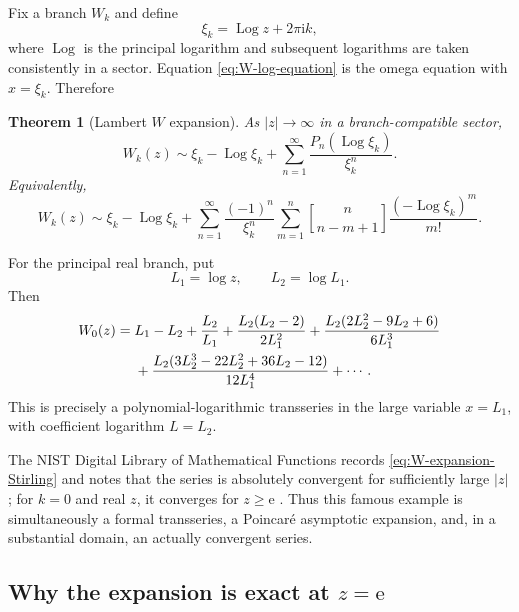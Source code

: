\documentclass[11pt]{article}
\theoremstyle{pltheorem}
\newtheorem{theorem}{Theorem}[section]
\newcommand{\e}{\mathrm e}
\newcommand{\ii}{\mathrm i}
\newcommand{\Log}{\operatorname{Log}}
\newcommand{\stirlingone}[2]{\genfrac{[}{]}{0pt}{}{#1}{#2}}
\newcommand{\abs}[1]{\left|#1\right|}
\begin{document}
Fix a branch \(W_k\) and define
\begin{equation}\label{eq:xi-k}
 \xi_k=\Log z+2\pi\ii k,
\end{equation}
where \(\Log\) is the principal logarithm and subsequent logarithms are taken consistently in a sector.  Equation \cref{eq:W-log-equation} is the omega equation with \(x=\xi_k\).  Therefore
\begin{theorem}[Lambert \(W\) expansion]\label{thm:W-expansion}
As \(\abs{z}\to\infty\) in a branch-compatible sector,
\begin{equation}\label{eq:W-expansion-P}
 \boxed{\quad
 W_k(z)\sim \xi_k-\Log\xi_k
 +\sum_{n=1}^{\infty}
 \frac{P_n(\Log\xi_k)}{\xi_k^n}.
 \quad}
\end{equation}
Equivalently,
\begin{equation}\label{eq:W-expansion-Stirling}
 W_k(z)\sim\xi_k-\Log\xi_k
 +\sum_{n=1}^{\infty}\frac{(-1)^n}{\xi_k^n}
 \sum_{m=1}^{n}\stirlingone{n}{n-m+1}
 \frac{(-\Log\xi_k)^m}{m!}.
\end{equation}
\end{theorem}

For the principal real branch, put
\begin{equation}\label{eq:L1-L2}
 L_1=\log z,
 \qquad
 L_2=\log L_1.
\end{equation}
Then
\begin{align}
 W_0(z)={}&L_1-L_2+\frac{L_2}{L_1}
 +\frac{L_2(L_2-2)}{2L_1^2}
 +\frac{L_2(2L_2^2-9L_2+6)}{6L_1^3}
 \notag\\
 &+\frac{L_2(3L_2^3-22L_2^2+36L_2-12)}{12L_1^4}
 +\cdots.
 \label{eq:W-first-terms}
\end{align}
This is precisely a polynomial-logarithmic transseries in the large variable \(x=L_1\), with coefficient logarithm \(L=L_2\).

The NIST Digital Library of Mathematical Functions records
\cref{eq:W-expansion-Stirling} and notes that the series is absolutely convergent for sufficiently large \(\abs z\); for \(k=0\) and real \(z\), it converges for \(z\ge\e\) \cite{dlmf-W}.  Thus this famous example is simultaneously a formal transseries, a Poincar\'e asymptotic expansion, and, in a substantial domain, an actually convergent series.

\subsection{\texorpdfstring{Why the expansion is exact at \(z=\e\)}{Why the expansion is exact at z = e}}
\end{document}
